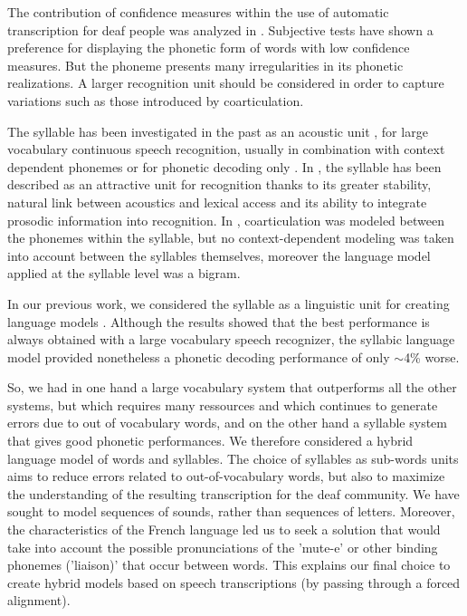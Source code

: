 \documentclass[a4paper]{article}
\begin{document}
The contribution of confidence measures \cite{Jiang2005} within the use of automatic transcription for deaf people was analyzed in \cite{Razik2008}.
Subjective tests have shown a preference for displaying the phonetic form of words with low confidence measures. But the phoneme presents many irregularities in its phonetic realizations. A larger recognition unit should  be considered in order to capture variations such as those introduced by coarticulation.

The syllable has been investigated in the past as an acoustic unit \cite{Wu1998, Zhang2002, Tachbelie2011}, for large vocabulary continuous speech recognition, usually in combination with context dependent phonemes \cite{Ganapathiraju2001,Hamalainen2005} or for phonetic decoding only \cite{Blouch2006}.
In \cite{Wu1998}, the syllable has been described as an attractive unit for recognition thanks to its greater stability, natural link between acoustics and lexical access and its ability to integrate prosodic information into recognition.
In \cite{Blouch2006}, coarticulation was modeled between the phonemes within the syllable, but no context-dependent modeling was taken into account between the syllables themselves, moreover the language model applied at the syllable level was a bigram.

In our previous work, we considered the syllable as a linguistic unit for creating language models  \cite{Orosanu2013_1,Orosanu2013_2}. Although the results showed that the best performance is always obtained with a large vocabulary speech recognizer, the syllabic language model provided nonetheless a phonetic decoding performance of only $\sim$4\% worse.

So, we had in one hand a large vocabulary system that outperforms all the other systems, but which requires many ressources and which continues to generate errors due to out of vocabulary words, and on the other hand a syllable system that gives good phonetic performances. We therefore considered a hybrid language model of words and syllables.
The choice of syllables as sub-words units aims to reduce errors related to out-of-vocabulary words, but also to maximize the understanding of the resulting transcription for the deaf community. We have sought to model sequences of sounds, rather than sequences of letters. Moreover, the characteristics of the French language led us to seek a solution that would take into account the possible pronunciations of the 'mute-e' or other binding phonemes ('liaison)' that occur between words. This explains our final choice to create hybrid models based on speech transcriptions (by passing through a forced alignment).
\end{document}

